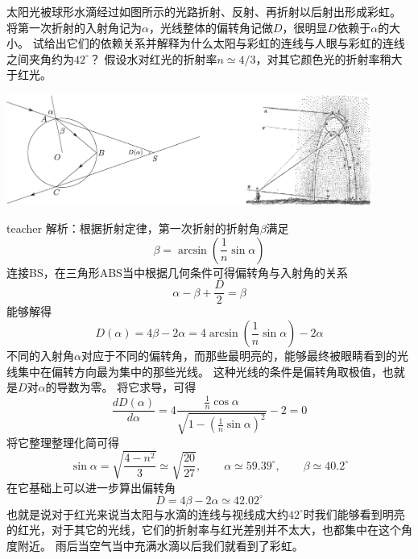 \begin{example}
太阳光被球形水滴经过如图所示的光路折射、反射、再折射以后射出形成彩虹。
将第一次折射的入射角记为$\alpha$，光线整体的偏转角记做$D$，很明显$D$依赖于$\alpha$的大小。
试给出它们的依赖关系并解释为什么太阳与彩虹的连线与人眼与彩虹的连线之间夹角约为$42^\circ$？
假设水对红光的折射率$n\simeq 4/3$，对其它颜色光的折射率稍大于红光。

\includegraphics[width=0.9\textwidth]{images/rainbow.pdf}
\begin{taggedblock}{teacher}
\newline
解析：根据折射定律，第一次折射的折射角$\beta$满足
\[
\beta = \arcsin\left (\frac{1}{n}\sin\alpha\right )
\]
连接BS，在三角形ABS当中根据几何条件可得偏转角与入射角的关系
\[
\alpha-\beta+\frac{D}{2}=\beta
\]
能够解得
\[ D(\alpha)=4\beta-2\alpha = 4\arcsin\left (\frac{1}{n}\sin\alpha\right )-2\alpha \]
不同的入射角$\alpha$对应于不同的偏转角，而那些最明亮的，能够最终被眼睛看到的光线集中在偏转方向最为集中的那些光线。
这种光线的条件是偏转角取极值，也就是$D$对$\alpha$的导数为零。
将它求导，可得
\[
\frac{dD(\alpha)}{d\alpha}=4\frac{\frac{1}{n}\cos\alpha}{\sqrt{1-(\frac{1}{n}\sin\alpha)^2}}-2=0
\]
将它整理整理化简可得
\[
\sin\alpha = \sqrt{\frac{4-n^2}{3}}\simeq\sqrt{\frac{20}{27}},\qquad \alpha\simeq 59.39^\circ,\qquad \beta\simeq 40.2^\circ
\]
在它基础上可以进一步算出偏转角
\[D =4\beta-2\alpha \simeq 42.02^\circ \]
也就是说对于红光来说当太阳与水滴的连线与视线成大约$42^\circ$时我们能够看到明亮的红光，对于其它的光线，它们的折射率与红光差别并不太大，也都集中在这个角度附近。
雨后当空气当中充满水滴以后我们就看到了彩虹。

\end{taggedblock}
\end{example}




